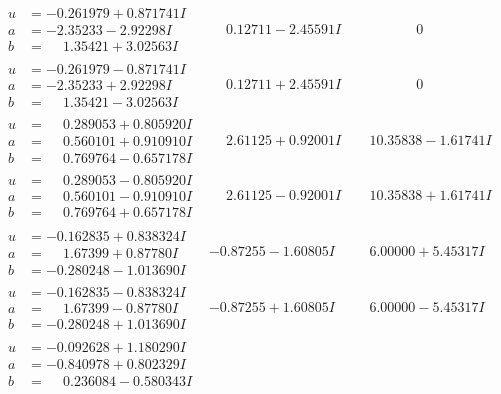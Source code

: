 \documentclass[1p]{elsarticle_modified}
\theoremstyle{definition}
\begin{document}
$$\begin{array}{c|c|c}
\begin{aligned}
u &= -0.261979 + 0.871741 I \\
a &= -2.35233 - 2.92298 I \\
b &= \phantom{-}1.35421 + 3.02563 I\end{aligned}
 & \phantom{-}0.12711 - 2.45591 I & \phantom{-0.000000 } 0 \\ \hline\begin{aligned}
u &= -0.261979 - 0.871741 I \\
a &= -2.35233 + 2.92298 I \\
b &= \phantom{-}1.35421 - 3.02563 I\end{aligned}
 & \phantom{-}0.12711 + 2.45591 I & \phantom{-0.000000 } 0 \\ \hline\begin{aligned}
u &= \phantom{-}0.289053 + 0.805920 I \\
a &= \phantom{-}0.560101 + 0.910910 I \\
b &= \phantom{-}0.769764 - 0.657178 I\end{aligned}
 & \phantom{-}2.61125 + 0.92001 I & \phantom{-}10.35838 - 1.61741 I \\ \hline\begin{aligned}
u &= \phantom{-}0.289053 - 0.805920 I \\
a &= \phantom{-}0.560101 - 0.910910 I \\
b &= \phantom{-}0.769764 + 0.657178 I\end{aligned}
 & \phantom{-}2.61125 - 0.92001 I & \phantom{-}10.35838 + 1.61741 I \\ \hline\begin{aligned}
u &= -0.162835 + 0.838324 I \\
a &= \phantom{-}1.67399 + 0.87780 I \\
b &= -0.280248 - 1.013690 I\end{aligned}
 & -0.87255 - 1.60805 I & \phantom{-}6.00000 + 5.45317 I \\ \hline\begin{aligned}
u &= -0.162835 - 0.838324 I \\
a &= \phantom{-}1.67399 - 0.87780 I \\
b &= -0.280248 + 1.013690 I\end{aligned}
 & -0.87255 + 1.60805 I & \phantom{-}6.00000 - 5.45317 I \\ \hline\begin{aligned}
u &= -0.092628 + 1.180290 I \\
a &= -0.840978 + 0.802329 I \\
b &= \phantom{-}0.236084 - 0.580343 I\end{aligned}

\end{array}$$
\end{document}
